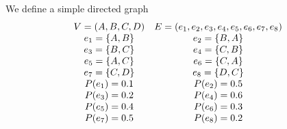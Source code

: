 We define a simple directed graph
\begin{equation}
	\begin{array}{c c}
	V=(A,B,C,D) &
	E=(e_{1},e_{2},e_{3},e_{4},e_{5},e_{6},e_{7},e_{8})\\
	e_{1}=\{A,B\} & e_{2}=\{B,A\}\\
	e_{3}=\{B,C\} & e_{4}=\{C,B\}\\
	e_{5}=\{A,C\} & e_{6}=\{C,A\}\\
	e_{7}=\{C,D\} & e_{8}=\{D,C\}\\ 
	P(e_{1})=0.1 & P(e_{2})=0.5\\
	P(e_{3})=0.2 & P(e_{4})=0.6\\
	P(e_{5})=0.4 & P(e_{6})=0.3\\
	P(e_{7})=0.5 & P(e_{8})=0.2\\ 
	\end{array}
\end{equation}
